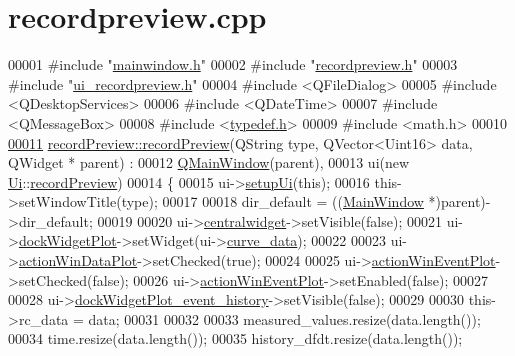 \hypertarget{a00129_source}{\section{recordpreview.\+cpp}
\label{a00129_source}
}

\begin{DoxyCode}
00001 \textcolor{preprocessor}{#include "\hyperlink{a00110}{mainwindow.h}"}
00002 \textcolor{preprocessor}{#include "\hyperlink{a00130}{recordpreview.h}"}
00003 \textcolor{preprocessor}{#include "\hyperlink{a00140}{ui\_recordpreview.h}"}
00004 \textcolor{preprocessor}{#include <QFileDialog>}
00005 \textcolor{preprocessor}{#include <QDesktopServices>}
00006 \textcolor{preprocessor}{#include <QDateTime>}
00007 \textcolor{preprocessor}{#include <QMessageBox>}
00008 \textcolor{preprocessor}{#include <\hyperlink{a00004}{typedef.h}>}
00009 \textcolor{preprocessor}{#include <math.h>}
00010 
\hypertarget{a00129_source_l00011}{}\hyperlink{a00073_a03ad4ae83a5594f6dc337c7b71873edd}{00011} \hyperlink{a00073_a03ad4ae83a5594f6dc337c7b71873edd}{recordPreview::recordPreview}(QString type, QVector<Uint16> data, QWidget *
      parent) :
00012     \hyperlink{a00058}{QMainWindow}(parent),
00013     ui(new \hyperlink{a00145}{Ui}::\hyperlink{a00073}{recordPreview})
00014 \{
00015     ui->\hyperlink{a00081_afa41dc070a896a5eae476f3c0206825c}{setupUi}(\textcolor{keyword}{this});
00016     this->setWindowTitle(type);
00017 
00018     dir\_default = ((\hyperlink{a00017}{MainWindow} *)parent)->dir\_default;
00019 
00020     ui->\hyperlink{a00081_ac9ab4609922159e8e4cc45905f76928e}{centralwidget}->setVisible(\textcolor{keyword}{false});
00021     ui->\hyperlink{a00081_a07b76f17803ec09e0367b72938bbd097}{dockWidgetPlot}->setWidget(ui->\hyperlink{a00081_a247d94481323c0bc4f8b6458a8a535dd}{curve\_data});
00022 
00023     ui->\hyperlink{a00081_aa09067a9c96c9cd78f75261a9fcb89f0}{actionWinDataPlot}->setChecked(\textcolor{keyword}{true});
00024 
00025     ui->\hyperlink{a00081_ac72ec9c8679d46fd43a87f99ee6db893}{actionWinEventPlot}->setChecked(\textcolor{keyword}{false});
00026     ui->\hyperlink{a00081_ac72ec9c8679d46fd43a87f99ee6db893}{actionWinEventPlot}->setEnabled(\textcolor{keyword}{false});
00027 
00028     ui->\hyperlink{a00081_a2a8f7ee8d4458dd20481c8a1c29ce185}{dockWidgetPlot\_event\_history}->setVisible(\textcolor{keyword}{false});
00029 
00030     this->rc\_data = data;
00031 
00032 
00033     measured\_values.resize(data.length());
00034     time.resize(data.length());
00035     history\_dfdt.resize(data.length());

\end{DoxyCode}
